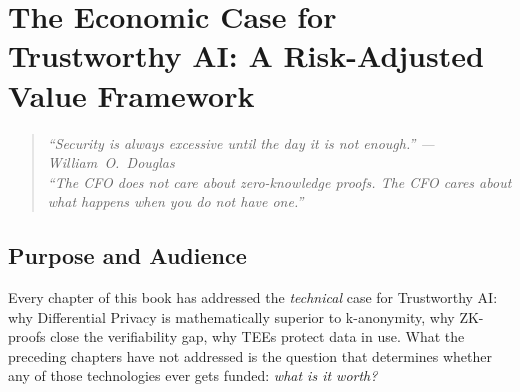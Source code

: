 


\chapter{The Economic Case for Trustworthy AI: A Risk-Adjusted
         Value Framework}
\label{app:roi-of-trust}

\begin{quote}
\textit{``Security is always excessive until the day it is not
enough.''
\hfill ---William~O.~Douglas \\[6pt]
``The CFO does not care about zero-knowledge proofs.
The CFO cares about what happens when you do not have one.''}
\end{quote}

\section*{Purpose and Audience}
\label{sec:app-purpose}

Every chapter of this book has addressed the \emph{technical}
case for Trustworthy AI: why Differential Privacy is mathematically
superior to k-anonymity, why ZK-proofs close the verifiability
gap, why TEEs protect data in use.
What the preceding chapters have not addressed is the question
that determines whether any of those technologies ever gets
funded: \emph{what is it worth?}

